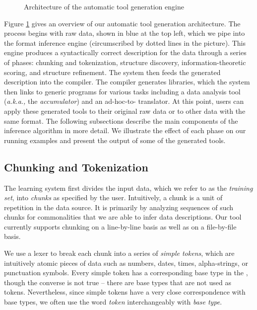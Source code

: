 
\begin{figure}
\begin{center}
\caption{Architecture of the automatic tool generation engine}
\vspace*{-5mm}
\label{fig-archi}
\end{center}
\end{figure}

Figure \ref{fig-archi} gives an overview of our automatic
tool generation architecture. The process 
begins with raw data, shown in blue at the top left, which we pipe
into the format inference engine
(circumscribed by dotted lines in the picture).  
This engine produces a syntactically correct \pads{}
description for the data
through a series of phases:
chunking and tokenization, structure discovery, information-theoretic
scoring, and structure refinement.
The system then feeds the generated \pads{} description into the
\pads{} compiler.  The compiler generates libraries, which the system
then links to generic programs for various tasks including a data
analysis tool ({\em a.k.a.,} the {\em accumulator}) and an
ad-hoc-to-\xml{} translator.  At this point, users can apply these
generated tools to their original raw data or to other data with the
same format.
The following subsections describe the main components of the
inference algorithm in more detail.  We 
illustrate the effect of each phase on our running examples and
present the output of some of the generated tools.

\subsection{Chunking and Tokenization}
The learning system first divides the input data, which we refer
to as the {\em training set}, into {\em chunks} as specified by the
user. Intuitively, a chunk is a unit of repetition in the data source.
It is primarily by analyzing sequences of such chunks for commonalities
that we are able to infer data descriptions.  Our tool currently supports
chunking on a line-by-line basis as well as on a file-by-file basis.  

We use a lexer to break each chunk into a series of {\em simple
tokens}, which are intuitively atomic pieces of data such as
numbers, dates, times, alpha-strings, or punctuation symbols.
Every simple token has a corresponding
base type in the \ir{}, though the converse is not true -- there are 
base types that are not used as tokens.  Nevertheless, since
simple tokens have a very close correspondence with base types,
we often use the word {\em token} interchangeably with {\em base type}.
  
